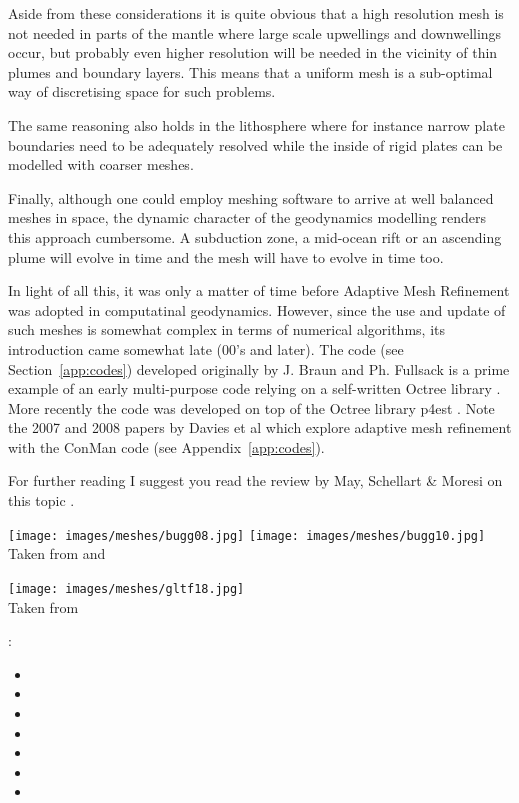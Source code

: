 Aside from these considerations it is quite obvious that a high resolution mesh is not needed 
in parts of the mantle where large scale upwellings and downwellings occur, but 
probably even higher resolution will be needed in the vicinity of thin plumes and boundary layers. 
This means that a uniform mesh is a sub-optimal way of discretising space for such problems. 

The same reasoning also holds in the lithosphere where for instance narrow plate boundaries need to 
be adequately resolved while the inside of rigid plates can be modelled with coarser meshes. 

Finally, although one could employ meshing software to arrive at well balanced meshes in space, the 
dynamic character of the geodynamics modelling renders this approach cumbersome. A subduction zone, 
a mid-ocean rift or an ascending plume will evolve in time and the mesh will have to evolve in time too. 

In light of all this, it was only a matter of time before Adaptive Mesh Refinement was adopted 
in computatinal geodynamics. However, since the use and update of such meshes is somewhat 
complex in terms of numerical algorithms, its introduction came somewhat late (00's and later).
The \douar code (see Section~\ref{app:codes}) developed originally by J. Braun and Ph. Fullsack 
is a prime example of an early multi-purpose code relying on a self-written Octree library \cite{brtf08}.
More recently the \aspect{} code was developed on top of the Octree library p4est \cite{buwg11}.
Note the 2007 and 2008 papers by Davies et al \cite{dadh07,dadh08} which explore adaptive mesh 
refinement with the ConMan code (see Appendix~\ref{app:codes}).

For further reading I suggest you read the review by May, Schellart \& Moresi on this topic \cite{masm13}.

\begin{center}
\texttt{[image: images/meshes/bugg08.jpg]}
\texttt{[image: images/meshes/bugg10.jpg]}\\
{\captionfont Taken from \cite{bugg08} and \cite{bugg10}}
\end{center}

\begin{center}
\texttt{[image: images/meshes/gltf18.jpg]}\\
{\captionfont Taken from \cite{gltf18}}
\end{center}

\Literature: 
\begin{itemize}
\item {}
\item {}
\item {}
\item {}
\item {}
\item {}
\item {}
\end{itemize}

